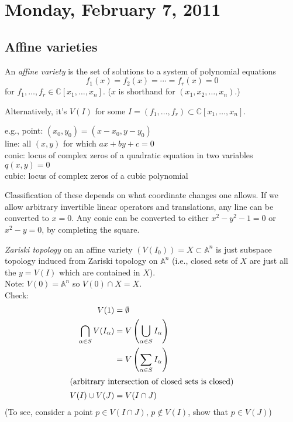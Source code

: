 \documentclass [letterpaper,11pt,twoside] {article}
\begin{document}
\setcounter {section}{1}\section {Monday, February 7, 2011}
  \subsection{Affine varieties}
    \begin{defn*}
      An \emph{affine variety} is the set of solutions to a system of polynomial equations $$f_1(x) = f_2(x) = \cdots = f_r(x) = 0$$
      for $f_1, \ldots, f_r\in \mathbb C[x_1, \ldots, x_n]$.  ($x$ is shorthand for $(x_1, x_2, \ldots, x_n)$.)
    \end{defn*}
    Alternatively, it's $V(I)$ for some $I = (f_1, \ldots, f_r) \subset \mathbb C[x_1, \ldots, x_n]$.

    e.g., point: $(x_0, y_0) = (x - x_0, y - y_0)$ \\
    line: all $(x, y)$ for which $ax + by + c = 0$ \\
    conic: locus of complex zeros of a quadratic equation in two variables $q(x, y) = 0$ \\
    cubic: locus of complex zeros of a cubic polynomial

    Classification of these depends on what coordinate changes one allows.  If we allow arbitrary invertible linear operators and translations, any line can be converted to $x = 0$.
    Any conic can be converted to either $x^2 - y^2 - 1 = 0$ or $x^2 - y = 0$, by completing the square.

    \emph{Zariski topology} on an affine variety $(V(I_0)) = X \subset \mathbb A^n$ is just subspace topology induced from Zariski topology on $\mathbb A^n$ (i.e., closed sets of $X$ are just all the $y = V(I)$ which are contained in $X$).  \\
    Note: $V(0) = \mathbb A^n$ so $V(0) \cap X = X$. \\
    Check:
    \begin{align*}
      V(1) & = \emptyset \\
      \bigcap_{\alpha\in S} V(I_\alpha) & = V\left(\bigcup_{\alpha\in S} I_\alpha\right) \\
         & = V\left(\sum_{\alpha\in S} I_\alpha\right) \\
      \intertext{(arbitrary intersection of closed sets is closed)}
      V(I) \cup V(J) & = V(I \cap J)
    \end{align*}
    (To see, consider a point $p\in V(I \cap J)$, $p\notin V(I)$, show that $p\in V(J)$)
\end{document}
